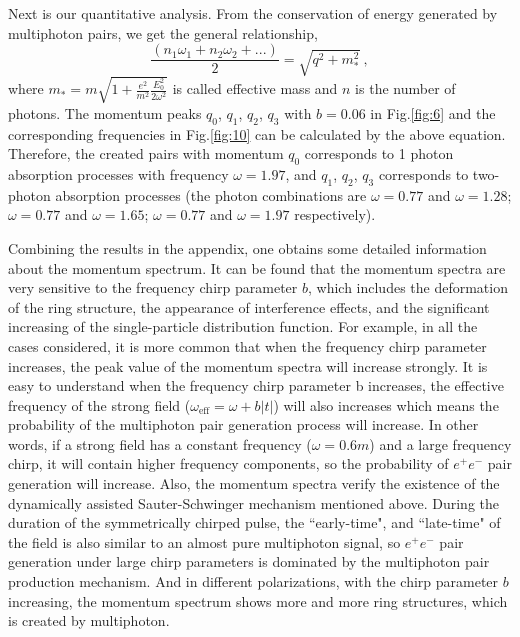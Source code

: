 \documentclass[aps,preprint,superscriptaddress]{revtex4}
\begin{document}
Next is our quantitative analysis. From the conservation of energy generated by multiphoton pairs, we get the general relationship,
\begin{equation}
\frac{(n_{1}\omega_{1}+n_{2}\omega_{2}+...)}{2}=\sqrt{{q}^2+m_{*}^2} ~,
\end{equation}
where $m_{*}=m \sqrt{1+\frac{e^{2}}{m^{2}} \frac{E_{0}^{2}}{2 \omega^{2}}}$ is called effective mass \cite{Ko2014} and $n$ is the number of photons. The momentum peaks $q_{0}$, $q_{1}$, $q_{2}$, $q_{3}$ with $b=0.06$ in Fig.\ref{fig:6} and the corresponding frequencies in Fig.\ref{fig:10} can be calculated by the above equation. Therefore, the created pairs with momentum $q_{0}$ corresponds to 1 photon absorption processes with frequency $\omega=1.97$, and $q_{1}$, $q_{2}$, $q_{3}$ corresponds to two-photon absorption processes (the photon combinations are $\omega=0.77$ and $\omega=1.28$; $\omega=0.77$ and $ \omega=1.65$; $\omega=0.77$ and $ \omega=1.97$ respectively).






\bigskip

Combining the results in the appendix, one obtains some detailed information about the momentum spectrum. It can be found that the momentum spectra are very sensitive to the frequency chirp parameter $b$, which includes the deformation of the ring structure, the appearance of interference effects, and the significant increasing of the single-particle distribution function. For example, in all the cases considered, it is more common that when the frequency chirp parameter increases, the peak value of the momentum spectra will increase strongly. It is easy to understand when the frequency chirp parameter b increases, the effective frequency of the strong field ($\omega_{\mathrm{eff}}= \omega + b|t|$) will also increases which means the probability of the multiphoton pair generation process will increase. In other words, if a strong field has a constant frequency ($\omega=0.6m$) and a large frequency chirp, it will contain higher frequency components, so the probability of $e^{+}e^{-}$ pair generation will increase.
Also, the momentum spectra verify the existence of the dynamically assisted Sauter-Schwinger mechanism \cite{Li:2014pp,Schutzhold:2008pz,Abdukerim:2012ke} mentioned above. During the duration of the symmetrically chirped pulse, the ``early-time", and ``late-time" of the field is also similar to an almost pure multiphoton signal, so $e^{+}e^{-}$ pair generation under large chirp parameters is dominated by the multiphoton pair production mechanism. And in different polarizations, with the chirp parameter $b$ increasing, the momentum spectrum shows more and more ring structures, which is created by multiphoton.
\end{document}
